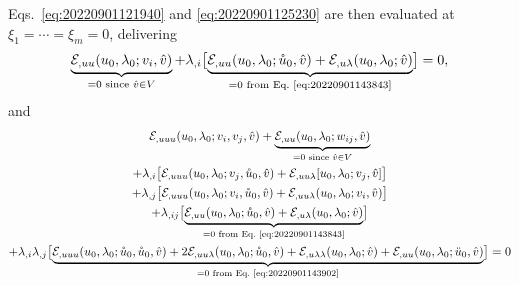 \documentclass[12pt, final]{scrartcl}
\theoremstyle{definition}
\newcommand{\E}{\mathcal E}
\begin{document}
Eqs.~\eqref{eq:20220901121940} and \eqref{eq:20220901125230} are then evaluated at $\xi_1 = \cdots = \xi_m = 0$,
delivering
\begin{equation}
  \label{eq:20220901152056}
  \underbrace{\E_{,uu}(u_0, \lambda_0; v_i, \hat{v})}_{=0 \text{ since } \hat{v} \in V}
  + \lambda_{, i} \bigl[ \underbrace{\E_{,uu}(u_0, \lambda_0; \mathring{u}_0, \hat{v}) +  \E_{,u\lambda}(u_0, \lambda_0; \hat{v})}_{ = 0 \text{ from Eq.~\eqref{eq:20220901143843}}} \bigr] = 0,
\end{equation}
and
\begin{equation}
  \label{eq:20220901152145}
  \begin{gathered}[b]
    \E_{,uuu}(u_0, \lambda_0; v_i , v_j, \hat{v}) + \underbrace{\E_{,uu}(u_0, \lambda_0; w_{ij}, \hat{v})}_{=0 \text{ since } \hat{v} \in V}\\
    +\lambda_{,i} \bigl[\E_{,uuu}(u_0, \lambda_0; v_j , \mathring{u}_0, \hat{v}) + \E_{,uu\lambda}[u_0, \lambda_0; v_j, \hat{v}]\bigr]\\
    +\lambda_{,j} \bigl[\E_{,uuu}(u_0, \lambda_0; v_i , \mathring{u}_0, \hat{v}) + \E_{,uu\lambda}(u_0, \lambda_0; v_i, \hat{v})\bigr]\\
    +\lambda_{,ij} \bigl[ \underbrace{\E_{,uu}(u_0, \lambda_0;  \mathring{u}_0, \hat{v}) + \E_{,u\lambda}(u_0, \lambda_0; \hat{v})}_{ = 0 \text{ from Eq.~\eqref{eq:20220901143843}}} \bigr]\\
    +\lambda_{,i} \lambda_{,j}\bigl[ \underbrace{\E_{,uuu}(u_0, \lambda_0; \mathring{u}_0 , \mathring{u}_0, \hat{v}) + 2\E_{,uu\lambda}(u_0, \lambda_0; \mathring{u}_0, \hat{v}) + \E_{,u\lambda\lambda}(u_0, \lambda_0; \hat{v}) + \E_{,uu}(u_0, \lambda_0; \ddot{u}_0, \hat{v})}_{ = 0 \text{ from Eq.~\eqref{eq:20220901143902}}} \bigr] = 0
  \end{gathered}
\end{equation}
\end{document}
